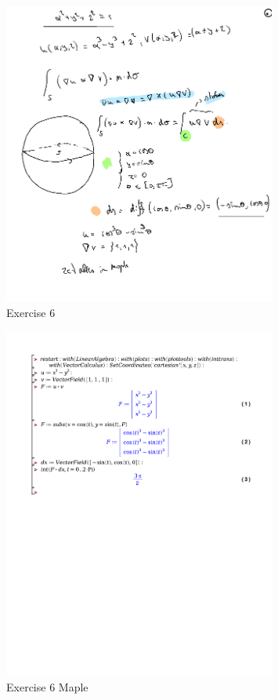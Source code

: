 \documentclass[a4paper]{report}
\begin{document}
\begin{figure}[H]
	\centering
	\includegraphics[width=0.8\textwidth]{assets/huis_7_ex_6.png}
	\caption{Exercise 6}
	\label{fig:huis_7_ex_6}
\end{figure}

\begin{figure}[H]
	\centering
	\includegraphics[width=0.8\textwidth]{exercises/huis_7_ex_6.pdf}
	\caption{Exercise 6 Maple}
	\label{fig:huis_7_ex_6}
\end{figure}
\end{document}
